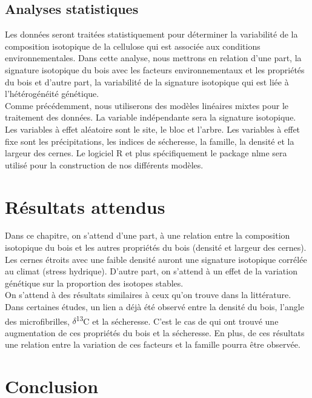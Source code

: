 \documentclass[a4paper,12pt]{report}
\newcommand{\Ctreize}{$\delta$\textsuperscript{13}C\xspace}
\begin{document}
\subsection*{Analyses statistiques}
Les données seront traitées statistiquement pour déterminer la variabilité de la composition isotopique de la cellulose qui est associée aux conditions environnementales. Dans cette analyse, nous mettrons en relation d'une part, la signature isotopique du bois avec les facteurs environnementaux et les propriétés du bois et d'autre part, la variabilité de la signature isotopique qui est liée à l'hétérogénéité génétique. \\

Comme précédemment, nous utiliserons des modèles linéaires mixtes pour le traitement des données. La variable indépendante sera la signature isotopique. Les variables à effet aléatoire sont le site, le bloc et l'arbre. Les variables à effet fixe sont les précipitations, les indices de sécheresse, la famille, la densité et la largeur des cernes. Le logiciel R et plus spécifiquement le package nlme sera utilisé pour la construction de nos différents modèles. 

\section{Résultats attendus}

Dans ce chapitre, on s'attend d'une part, à une relation entre la composition isotopique du bois et les autres propriétés du bois (densité et largeur des cernes). Les cernes étroits avec une faible densité auront une signature isotopique corrélée au climat (stress hydrique). D'autre part, on s'attend à un effet de la variation génétique sur la proportion des isotopes stables.\\

On s'attend à des résultats similaires à ceux qu'on trouve dans la littérature. Dans certaines études, un lien a déjà été observé entre la densité du bois, l'angle des microfibrilles, \Ctreize et la sécheresse. C'est le cas de \cite{Drew2009} qui ont trouvé une augmentation de ces propriétés du bois et la sécheresse. En plus, de ces résultats une relation entre la variation de ces facteurs et la famille pourra être observée.  

\section{Conclusion}
\end{document}
